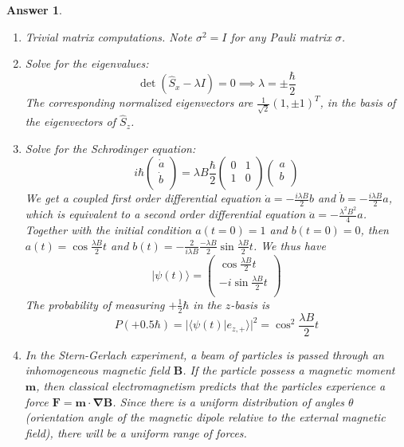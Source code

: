 \documentclass[a4paper]{article}
\newtheorem{ans}{Answer}[subsection]
\theoremstyle{new}
\begin{document}
\begin{ans}\leavevmode
\begin{enumerate}[label=(\alph*)]
\item Trivial matrix computations. Note $\sigma^2=I$ for any Pauli matrix $\sigma$.
\item Solve for the eigenvalues:
$$\det(\hat{S}_x-\lambda I)=0\implies\lambda=\pm\frac{\hbar}{2}$$
The corresponding normalized eigenvectors are $\frac{1}{\sqrt{2}}(1,\pm1)^T$, in the basis of the eigenvectors of $\hat{S}_z$.
\item Solve for the Schrodinger equation:
$$i\hbar\begin{pmatrix}\dot{a}\\\dot{b}\\\end{pmatrix}=\lambda B\frac{\hbar}{2}\begin{pmatrix}0&1\\1&0\\\end{pmatrix}\begin{pmatrix}a\\b\\\end{pmatrix}$$
We get a coupled first order differential equation $\dot{a}=-\frac{i\lambda B}{2}b$ and $\dot{b}=-\frac{i\lambda B}{2}a$, which is equivalent to a second order differential equation $\ddot{a}=-\frac{\lambda^2B^2}{4}a$. Together with the initial condition $a(t=0)=1$ and $b(t=0)=0$, then $a(t)=\cos\frac{\lambda B}{2}t$ and $b(t)=-\frac{2}{i\lambda B}\frac{-\lambda B}{2}\sin\frac{\lambda B}{2}t$. We thus have 
$$|\psi(t)\rangle=\begin{pmatrix}\cos\frac{\lambda B}{2}t\\-i\sin\frac{\lambda B}{2}t\\\end{pmatrix}$$
The probability of measuring $+\frac{1}{2}\hbar$ in the $z$-basis is
$$P(+0.5\hbar)=|\langle\psi(t)|e_{z,+}\rangle|^2=\cos^2\frac{\lambda B}{2}t$$
\newpage
\item In the Stern-Gerlach experiment, a beam of particles is passed through an inhomogeneous magnetic field $\mathbf{B}$. If the particle possess a magnetic moment $\mathbf{m}$, then classical electromagnetism predicts that the particles experience a force $\mathbf{F}=\mathbf{m}\cdot\boldsymbol{\nabla}\mathbf{B}$. Since there is a uniform distribution of angles $\theta$ (orientation angle of the magnetic dipole relative to the external magnetic field), there will be a uniform range of forces.\\[5pt]

\end{enumerate}
\end{ans}
\end{document}
